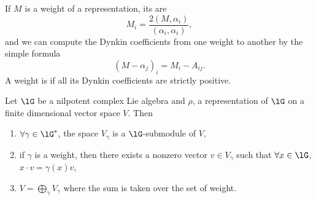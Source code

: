 If $M$ is a weight of a representation, its  are
\begin{equation}
	M_i=\frac{ 2(M,\alpha_i) }{ (\alpha_i,\alpha_i) },
\end{equation}
and we can compute the Dynkin coefficients from one weight to another by the simple formula
\begin{equation}        \label{EqCofDynMmoisAlpha}
	(M-\alpha_j)_i=M_i-A_{ij}.
\end{equation}
A weight is  if all its Dynkin coefficients are strictly positive.

\begin{proposition}\label{prop:trois_poids}
	Let $\lG$ be a nilpotent complex Lie algebra and $\rho$, a representation of $\lG$ on a finite dimensional vector space $V$. Then
	\begin{enumerate}
		\item $\forall \gamma\in\lG^*$, the space $V_{\gamma}$ is a $\lG$-submodule of $V$,
		\item if $\gamma$ is a weight, then there exists a nonzero vector $v\in V_{\gamma}$ such that $\forall x\in\lG$, $x\cdot v=\gamma(x)v$,
		      \label{prop:trois_poids:deux}
		      \item\label{ItemVSEZlhviii} $V=\bigoplus_{\gamma}V_{\gamma}$ where the sum is taken over the set of weight.
	\end{enumerate}
\end{proposition}

